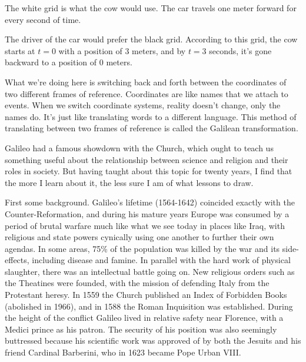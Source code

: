 The white grid is what the cow would use.
The car travels one meter
forward for every second of time.

The driver of the car would prefer the black grid. According to this grid, the cow starts at $t=0$
with a position of 3 meters, and by $t=3$ seconds, it's gone backward to a position of 0 meters.

What we're doing here is switching back and forth between the coordinates of two different frames
of reference. Coordinates are like names that we attach to events. When we switch coordinate systems,
reality doesn't change, only the names do. It's just like translating words to a different language.
This method of translating between two frames of reference is called the Galilean transformation.

\pagebreak


Galileo had a famous showdown with the Church, which ought to teach us something useful about
the relationship between science and religion and their roles in society. But having taught
about this topic for twenty years, I find that the more I learn about it, the less sure I am
of what lessons to draw.

First some background. Galileo's lifetime (1564-1642) coincided exactly
with the Counter-Reformation, and during his mature years Europe was consumed by a period
of brutal warfare much like what we see today in places like Iraq, with religious and state
powers cynically using one another to further their own agendas. In some areas, 75\% of
the population was killed by the war and its side-effects, including disease and famine.
In parallel with the hard work of physical slaughter, there was an intellectual battle going on.
New religious orders such as the Theatines were founded, with the mission of defending Italy from
the Protestant heresy. In 1559 the Church published an
Index of Forbidden Books (abolished in 1966), and in 1588 the Roman Inquisition was established.
During the height of the conflict Galileo lived in relative safety near Florence, with a Medici prince as his patron.
The security of his position was also seemingly buttressed because his scientific work was approved of by both
the Jesuits and his friend Cardinal Barberini, who in 1623 became Pope Urban VIII.

